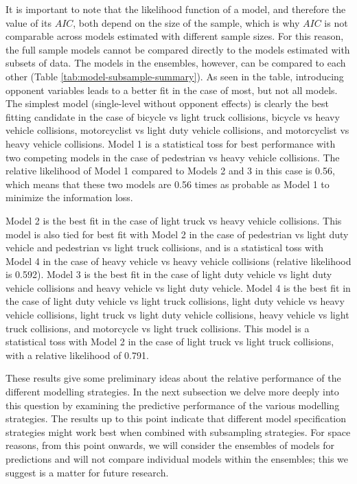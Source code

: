 \documentclass[]{elsarticle} %
\begin{document}
It is important to note that the likelihood function of a model, and
therefore the value of its \(AIC\), both depend on the size of the
sample, which is why \(AIC\) is not comparable across models estimated
with different sample sizes. For this reason, the full sample models
cannot be compared directly to the models estimated with subsets of
data. The models in the ensembles, however, can be compared to each
other (Table \ref{tab:model-subsample-summary}). As seen in the table,
introducing opponent variables leads to a better fit in the case of
most, but not all models. The simplest model (single-level without
opponent effects) is clearly the best fitting candidate in the case of
bicycle vs light truck collisions, bicycle vs heavy vehicle collisions,
motorcyclist vs light duty vehicle collisions, and motorcyclist vs heavy
vehicle collisions. Model 1 is a statistical toss for best performance
with two competing models in the case of pedestrian vs heavy vehicle
collisions. The relative likelihood of Model 1 compared to Models 2 and
3 in this case is 0.56, which means that these two models are 0.56 times
as probable as Model 1 to minimize the information loss.

Model 2 is the best fit in the case of light truck vs heavy vehicle
collisions. This model is also tied for best fit with Model 2 in the
case of pedestrian vs light duty vehicle and pedestrian vs light truck
collisions, and is a statistical toss with Model 4 in the case of heavy
vehicle vs heavy vehicle collisions (relative likelihood is 0.592).
Model 3 is the best fit in the case of light duty vehicle vs light duty
vehicle collisions and heavy vehicle vs light duty vehicle. Model 4 is
the best fit in the case of light duty vehicle vs light truck
collisions, light duty vehicle vs heavy vehicle collisions, light truck
vs light duty vehicle collisions, heavy vehicle vs light truck
collisions, and motorcycle vs light truck collisions. This model is a
statistical toss with Model 2 in the case of light truck vs light truck
collisions, with a relative likelihood of 0.791.

These results give some preliminary ideas about the relative performance
of the different modelling strategies. In the next subsection we delve
more deeply into this question by examining the predictive performance
of the various modelling strategies. The results up to this point
indicate that different model specification strategies might work best
when combined with subsampling strategies. For space reasons, from this
point onwards, we will consider the ensembles of models for predictions
and will not compare individual models within the ensembles; this we
suggest is a matter for future research.
\end{document}
